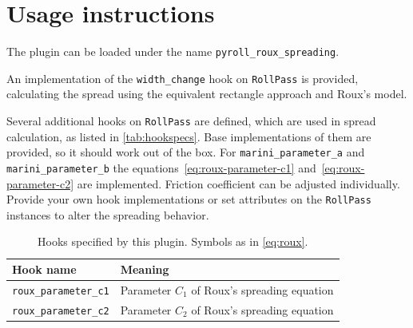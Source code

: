 \documentclass[11pt]{PyRollDocs}
\begin{document}
    \section{Usage instructions}\label{sec:usage-instructions}

    The plugin can be loaded under the name \texttt{pyroll\_roux\_spreading}.

    An implementation of the \lstinline{width_change} hook on \lstinline{RollPass} is provided,
    calculating the spread using the equivalent rectangle approach and Roux's model.

    Several additional hooks on \lstinline{RollPass} are defined, which are used in spread calculation, as listed in \autoref{tab:hookspecs}.
    Base implementations of them are provided, so it should work out of the box.
    For \lstinline{marini_parameter_a} and \lstinline{marini_parameter_b} the equations~\ref{eq:roux-parameter-c1} and~\ref{eq:roux-parameter-c2} are implemented.
    Friction coefficient can be adjusted individually.
    Provide your own hook implementations or set attributes on the \lstinline{RollPass} instances to alter the spreading behavior.

    \begin{table}
        \centering
        \caption{Hooks specified by this plugin. Symbols as in \autoref{eq:roux}.}
        \label{tab:hookspecs}
        \begin{tabular}{ll}
            \toprule
            Hook name                     & Meaning                                      \\
            \midrule
            \texttt{roux\_parameter\_c1}   & Parameter $C_1$ of Roux's spreading equation \\
            \texttt{roux\_parameter\_c2}   & Parameter $C_2$ of Roux's spreading equation \\
            \bottomrule
        \end{tabular}
    \end{table}

    \printbibliography
\end{document}
